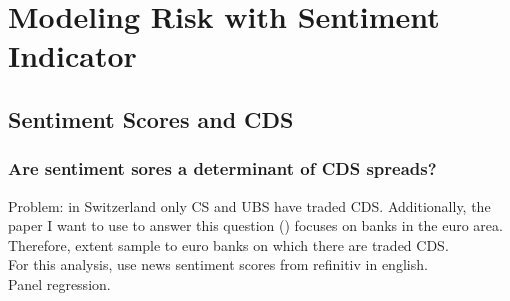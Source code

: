 \chapter{Modeling Risk with Sentiment Indicator}\label{sec6}
\thispagestyle{empty}

%
%
%
%

\section{Sentiment Scores and CDS}

\subsection{Are sentiment sores a determinant of CDS spreads?}

Problem: in Switzerland only CS and UBS have traded CDS. Additionally, the paper I want to use to answer this question (\cite{annaert2013}) focuses on banks in the euro area. Therefore, extent sample to euro banks on which there are traded CDS.\\
For this analysis, use news sentiment scores from refinitiv in english. \\

Panel regression. \\

